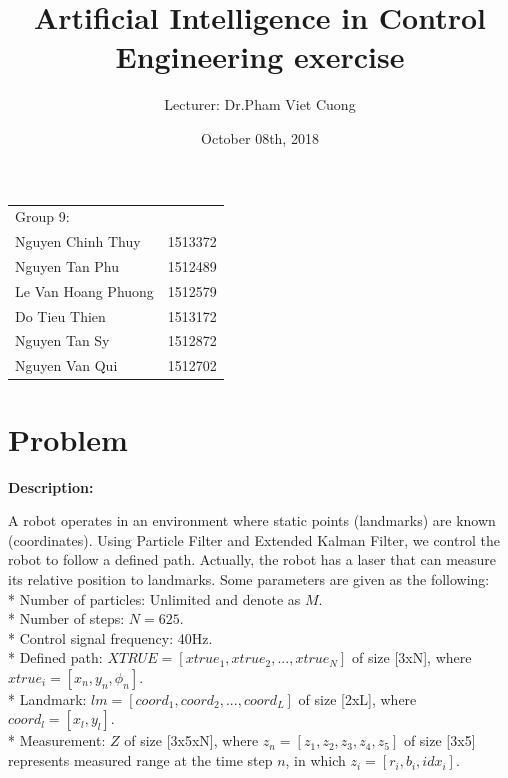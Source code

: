 \documentclass{article}
\title{Artificial Intelligence in Control Engineering exercise}
\author{
	Lecturer: Dr.Pham Viet Cuong	\\
}
\date{October 08th, 2018}
\begin{document}
\maketitle 					%

\begin{center}
	\begin{tabular}{l l}
	Group 9: \\
	Nguyen Chinh Thuy 	& 1513372	\\
	Nguyen Tan Phu		& 1512489	\\
	Le Van Hoang Phuong	& 1512579	\\
	Do Tieu Thien		& 1513172			\\
	Nguyen Tan Sy		& 1512872	\\
	Nguyen Van Qui		& 1512702
	\end{tabular}
\end{center}


\section{Problem}
\textbf{Description:}

A robot operates in an environment where static points (landmarks) are known (coordinates). Using Particle Filter and Extended Kalman Filter, we control the robot to follow a defined path. Actually, the robot has a laser that can measure its relative position to landmarks. Some parameters are given as the following:\\

* Number of particles: Unlimited and denote as $M$.\\

* Number of steps: $N=625$.\\

* Control signal frequency: 40Hz.\\

* Defined path: $XTRUE = [xtrue_1, xtrue_2, ..., xtrue_N]$ of size [3xN], where $xtrue_i = [x_n, y_n, \phi_n]$.\\

* Landmark: $lm = [coord_1, coord_2, ..., coord_L]$ of size [2xL], where $coord_l = [x_l, y_l]$.\\

* Measurement: $Z$ of size [3x5xN], where $z_n = [z_1, z_2, z_3, z_4, z_5]$ of size [3x5] represents measured range at the time step $n$, in which $z_i = [r_i, b_i, idx_i]$.\\
\end{document}
